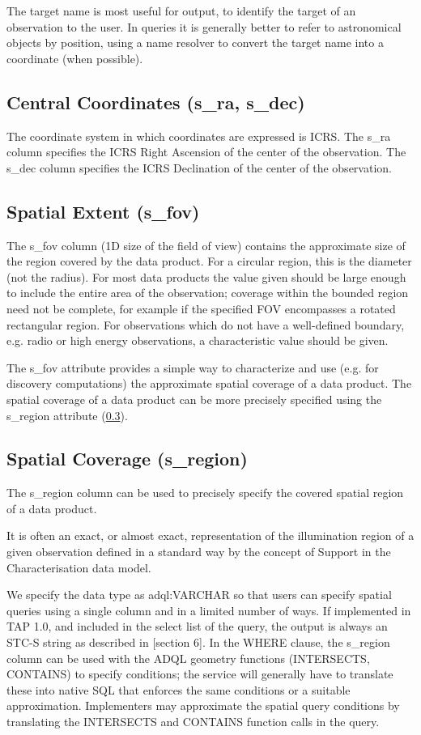 \documentclass[11pt,a4paper]{ivoa}
\begin{document}
The target name is most useful for output, to identify the target of an observation to the user.  In queries it is
generally better to refer to astronomical objects by position, using a name resolver to convert the target name into a
coordinate (when possible).

\subsection{Central Coordinates (s\_ra, s\_dec)}
The coordinate system in which coordinates are expressed is ICRS. The s\_ra column specifies the ICRS Right Ascension of
the center of the observation. The s\_dec column specifies the ICRS Declination of the center of the observation.

\subsection{Spatial Extent (s\_fov)}
The s\_fov column (1D size of the field of view) contains the approximate size of the region covered by the data
product.  For a circular region, this is the diameter (not the radius).  For most data products the value given should
be large enough to include the entire area of the observation; coverage within the bounded region need not be complete,
for example if the specified FOV encompasses a rotated rectangular region.  For observations which do not have a
well-defined boundary, e.g. radio or high energy observations, a characteristic value should be given.

The s\_fov attribute provides a simple way to characterize and use (e.g. for discovery computations) the approximate
spatial coverage of a data product.  The spatial coverage of a data product can be more precisely specified using the
s\_region attribute (\ref{bkm:Ref158024378}).

\subsection{Spatial Coverage (s\_region)}
\label{bkm:Ref158024378}The s\_region column can be used to precisely specify the covered spatial region of a data
product.

It is often an exact, or almost exact, representation of the illumination region of a given observation defined in a
standard way by the concept of Support in the Characterisation data model.

We specify the data type as adql:VARCHAR so that users can specify spatial queries using a single column and in a
limited number of ways. If implemented in TAP 1.0, and  included in the select list of the query, the output is always
an STC-S string as described in \citep{2010ivoa.spec.0327D} [section 6]. In the WHERE clause, the s\_region column can be
used with the ADQL geometry functions (INTERSECTS, CONTAINS) to specify conditions; the service will generally have to
translate these into native SQL that enforces the same conditions or a suitable approximation. Implementers may
approximate the spatial query conditions by translating the INTERSECTS and CONTAINS function calls in the query.
\end{document}
